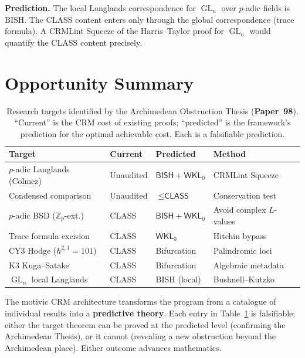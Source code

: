 \documentclass[11pt,twoside,openany]{report}
\theoremstyle{remark}
\newcommand{\BISH}{\textsf{BISH}}
\newcommand{\CLASS}{\textsf{CLASS}}
\newcommand{\paperref}[1]{\textbf{Paper~#1}}
\DeclareMathOperator{\GL}{GL}
\begin{document}
\textbf{Prediction.} The local Langlands correspondence for $\GL_n$ over $p$-adic fields is \BISH. The \CLASS{} content enters only through the global correspondence (trace formula). A CRMLint Squeeze of the Harris--Taylor proof for $\GL_n$ would quantify the \CLASS{} content precisely.


\section{Opportunity Summary}

\begin{table}[htbp]
\centering\small
\renewcommand{\arraystretch}{1.2}
\begin{tabular}{@{}p{3.5cm} l l p{3.2cm}@{}}
\toprule
\textbf{Target} & \textbf{Current} & \textbf{Predicted} & \textbf{Method} \\
\midrule
$p$-adic Langlands (Colmez) & Unaudited & $\BISH + \textsf{WKL}_0$ & CRMLint Squeeze \\
Condensed comparison & Unaudited & $\leq \CLASS$ & Conservation test \\
$p$-adic BSD ($\mathbb{Z}_p$-ext.) & \CLASS & $\BISH + \textsf{WKL}_0$ & Avoid complex $L$-values \\
Trace formula excision & \CLASS & $\textsf{WKL}_0$ & Hitchin bypass \\
CY3 Hodge ($h^{2,1}=101$) & \CLASS & Bifurcation & Palindromic loci \\
K3 Kuga--Satake & \CLASS & Bifurcation & Algebraic metadata \\
$\GL_n$ local Langlands & \CLASS & \BISH{} (local) & Bushnell--Kutzko \\
\bottomrule
\end{tabular}
\caption{Research targets identified by the Archimedean Obstruction Thesis (\paperref{98}). ``Current'' is the CRM cost of existing proofs; ``predicted'' is the framework's prediction for the optimal achievable cost. Each is a falsifiable prediction.}
\label{tab:opportunities}
\end{table}

\begin{thesisbox}
The motivic CRM architecture transforms the program from a catalogue of individual results into a \textbf{predictive theory}. Each entry in Table~\ref{tab:opportunities} is falsifiable: either the target theorem can be proved at the predicted level (confirming the Archimedean Thesis), or it cannot (revealing a new obstruction beyond the Archimedean place). Either outcome advances mathematics.
\end{thesisbox}
\end{document}
